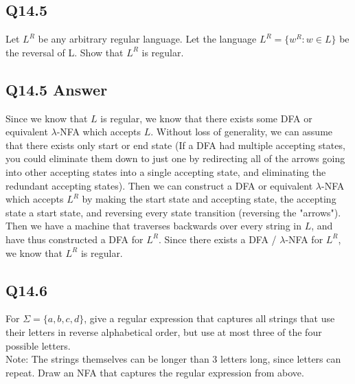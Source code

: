 \documentclass{article}
\begin{document}
\subsection*{Q14.5}
Let $L^R$ be any arbitrary regular language. Let the language $L^R = \{w^R : w \in L\}$ be the reversal of L.
Show that $L^R$ is regular.
\newpage
\subsection*{Q14.5 Answer}
Since we know that $L$ is regular, we know that there exists some DFA or equivalent $\lambda$-NFA which accepts $L$. Without loss of generality, we can
assume that there exists only start or end state (If a DFA had multiple accepting states, you could eliminate them down to just one 
by redirecting all of the arrows going into other accepting states into a single accepting state, and eliminating the redundant accepting
states). Then we can construct a DFA or equivalent $\lambda$-NFA which accepts $L^R$ by making the start state and accepting state, the accepting state
a start state, and reversing every state transition (reversing the "arrows"). Then we have a machine that traverses backwards over every
string in $L$, and have thus constructed a DFA for $L^R$. Since there exists a DFA / $\lambda$-NFA for $L^R$, we know that $L^R$ is regular.
\newpage
\subsection*{Q14.6}
For $\Sigma=\{a,b,c,d\}$, give a regular expression that captures all strings that use their letters in reverse alphabetical order, but use at most three of the four possible letters.
\\ Note: The strings themselves can be longer than 3 letters long, since letters can repeat.
 Draw an NFA that captures the regular expression from above.
\newpage
\end{document}

